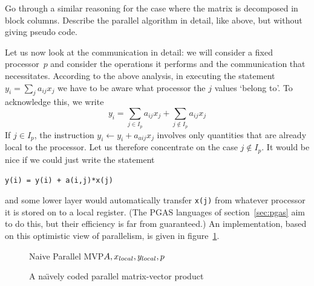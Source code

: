 \begin{exercise}
  Go through a similar reasoning for the case where the matrix is
  decomposed in block columns. Describe the parallel algorithm in
  detail, like above, but without giving pseudo code.
\end{exercise}

\def\sublocal{_{\mathrm\scriptstyle local}}%

Let us now look at the communication in detail: we will consider a
fixed processor~$p$ and consider the operations it performs and the
communication that necessitates.
According to the above analysis,
in executing the statement $y_i=\sum_ja_{ij}x_j$ we have
to be aware what processor the $j$ values `belong to'. To acknowledge
this, we write
\begin{equation}
  y_i=\sum_{j\in I_p}a_{ij}x_j+\sum_{j\not\in I_p}a_{ij}x_j
  \label{eq:yi=sum-in-and-not}
\end{equation}
If $j\in I_p$, the instruction $y_i \leftarrow y_i + a_{aij} x_j$
involves only quantities that are already local to
the processor.
Let us therefore concentrate on the case
$j\not\in I_p$.
It would be nice if we could just write the statement
\begin{verbatim}
y(i) = y(i) + a(i,j)*x(j)
\end{verbatim}
and some lower layer would automatically transfer \verb+x(j)+ from
whatever processor it is stored on to a local register. (The PGAS
languages of section~\ref{sec:pgas} aim to do this, but their
efficiency is far from guaranteed.) An implementation, based on this
optimistic view of parallelism, is given in figure~\ref{fig:naive-pmvp}.

\begin{figure}
  \begin{displayprocedure}{Naive Parallel MVP}{$A,x\sublocal,y\sublocal,p$}
  \end{displayprocedure}
  \caption{A na\"\i vely coded parallel matrix-vector product}
  \label{fig:naive-pmvp}
\end{figure}

